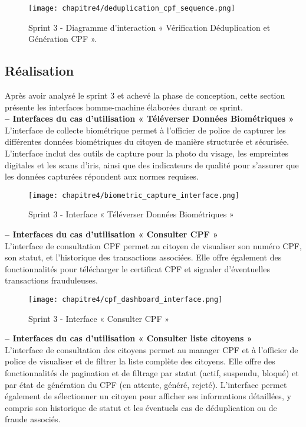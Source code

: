 \begin{figure}[H]
\centering
\texttt{[image: chapitre4/deduplication\_cpf\_sequence.png]}
\caption{ Sprint 3 - Diagramme d'interaction « Vérification Déduplication et Génération CPF ». }
\end{figure}

\subsection{Réalisation}
Après avoir analysé le sprint 3 et achevé la phase de conception, cette section présente les
interfaces homme-machine élaborées durant ce sprint.\\

\textbf{– Interfaces du cas d'utilisation « Téléverser Données Biométriques »}\\
L'interface de collecte biométrique permet à l'officier de police de capturer les différentes données biométriques du citoyen de manière structurée et sécurisée. L'interface inclut des outils de capture pour la photo du visage, les empreintes digitales et les scans d'iris, ainsi que des indicateurs de qualité pour s'assurer que les données capturées répondent aux normes requises.

\begin{figure}[H]
\centering
\texttt{[image: chapitre4/biometric\_capture\_interface.png]}
\caption{ Sprint 3 - Interface « Téléverser Données Biométriques » }
\end{figure}

\textbf{– Interfaces du cas d'utilisation « Consulter CPF »}\\
L'interface de consultation CPF permet au citoyen de visualiser son numéro CPF, son statut, et l'historique des transactions associées. Elle offre également des fonctionnalités pour télécharger le certificat CPF et signaler d'éventuelles transactions frauduleuses.

\begin{figure}[H]
\centering
\texttt{[image: chapitre4/cpf\_dashboard\_interface.png]}
\caption{ Sprint 3 - Interface « Consulter CPF » }
\end{figure}

\textbf{– Interfaces du cas d'utilisation « Consulter liste citoyens »}\\
L'interface de consultation des citoyens permet au manager CPF et à l'officier de police de visualiser et de filtrer la liste complète des citoyens. Elle offre des fonctionnalités de pagination et de filtrage par statut (actif, suspendu, bloqué) et par état de génération du CPF (en attente, généré, rejeté). L'interface permet également de sélectionner un citoyen pour afficher ses informations détaillées, y compris son historique de statut et les éventuels cas de déduplication ou de fraude associés.

